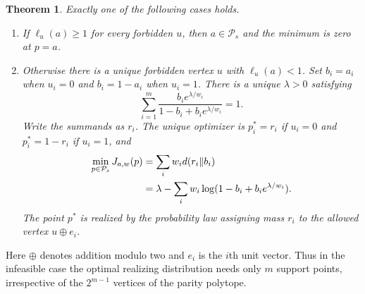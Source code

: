 \documentclass[11pt,a4paper]{article}
\newtheorem{theorem}{Theorem}[section]
\theoremstyle{definition}\newtheorem{definition}[theorem]{Definition}
\theoremstyle{remark}\newtheorem{remark}[theorem]{Remark}
\numberwithin{equation}{section}
\begin{document}
\begin{theorem}\label{R03-main}
Exactly one of the following cases holds.
\begin{enumerate}[label=(\roman*)]
\item If $\ell_u(a)\geq1$ for every forbidden $u$, then $a\in\mathcal P_s$ and the minimum is zero at $p=a$.
\item Otherwise there is a unique forbidden vertex $u$ with $\ell_u(a)<1$. Set $b_i=a_i$ when $u_i=0$ and $b_i=1-a_i$ when $u_i=1$. There is a unique $\lambda>0$ satisfying
\begin{equation}\label{R03-root}
\sum_{i=1}^m \frac{b_i e^{\lambda/w_i}}{1-b_i+b_i e^{\lambda/w_i}}=1.
\end{equation}
Write the summands as $r_i$. The unique optimizer is $p_i^*=r_i$ if $u_i=0$ and $p_i^*=1-r_i$ if $u_i=1$, and
\begin{align}\label{R03-value}
\min_{p\in\mathcal P_s}J_{a,w}(p)
&=\sum_iw_id(r_i\Vert b_i)\\
&=\lambda-\sum_iw_i\log(1-b_i+b_ie^{\lambda/w_i}).\notag
\end{align}
The point $p^*$ is realized by the probability law assigning mass $r_i$ to the allowed vertex $u\mathbin\oplus e_i$.
\end{enumerate}
\end{theorem}
Here $\oplus$ denotes addition modulo two and $e_i$ is the $i$th unit vector. Thus in the infeasible case the optimal realizing distribution needs only $m$ support points, irrespective of the $2^{m-1}$ vertices of the parity polytope.
\end{document}
